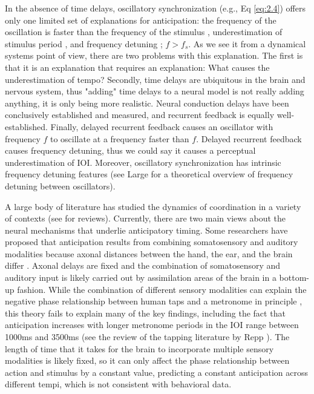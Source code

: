 \documentclass{report}
\begin{document}
In the absence of time delays, oscillatory synchronization (e.g., Eq \eqref{eq:2.4}) offers only one limited set of explanations for anticipation: the frequency of the oscillation is faster than the frequency of the stimulus \cite{kim2015signal}, underestimation of stimulus period \cite{flach2005transition}, and frequency detuning \cite{kelso1990action}; $f > f_s$. As we see it from a dynamical systems point of view, there are two problems with this explanation. The first is that it is an explanation that requires an explanation: What causes the underestimation of tempo? Secondly, time delays are ubiquitous in the brain and nervous system, thus "adding" time delays to a neural model is not really adding anything, it is only being more realistic. Neural conduction delays have been conclusively established and measured, and recurrent feedback is equally well-established. Finally, delayed recurrent feedback causes an oscillator with frequency $f$ to oscillate at a frequency faster than $f$. Delayed recurrent feedback causes frequency detuning, thus we could say it causes a perceptual underestimation of IOI. Moreover, oscillatory synchronization has intrinsic frequency detuning features (see Large \cite{large2008resonating} for a theoretical overview of frequency detuning between oscillators).

A large body of literature has studied the dynamics of coordination in a variety of contexts (see \cite{repp2005sensorimotor, repp2013sensorimotor} for reviews). Currently, there are two main views about the neural mechanisms that underlie anticipatory timing. Some researchers have proposed that anticipation results from combining somatosensory and auditory modalities because axonal distances between the hand, the ear, and the brain differ \cite{aschersleben1995synchronizing, prinz1992don}. Axonal delays are fixed and the combination of somatosensory and auditory input is likely carried out by assimilation areas of the brain in a bottom-up fashion. While the combination of different sensory modalities can explain the negative phase relationship between human taps and a metronome in principle \cite{aschersleben2002temporal, bialunska2011increasing}, this theory fails to explain many of the key findings, including the fact that anticipation increases with longer metronome periods in the IOI range between 1000ms and 3500ms (see the review of the tapping literature by Repp \cite{repp2005sensorimotor}). The length of time that it takes for the brain to incorporate multiple sensory modalities is likely fixed, so it can only affect the phase relationship between action and stimulus by a constant value, predicting a constant anticipation across different tempi, which is not consistent with behavioral data.
\end{document}
